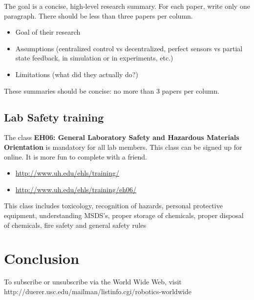 \documentclass[letterpaper, 10 pt, conference]{ieeeconf}
\begin{document}
The goal is a concise, high-level research summary.  For each paper, write only one paragraph.  There should be less than three papers per column.

\begin{itemize}
\item Goal of their research 
\item Assumptions (centralized control vs decentralized, perfect sensors vs partial state feedback, in simulation or in experiments, etc.)
\item Limitations (what did they actually do?)
\end{itemize}

These summaries should be concise: no more than 3 papers per column.


\subsection{Lab Safety training}

The class \textbf{EH06: General Laboratory Safety and Hazardous Materials Orientation} is mandatory for all lab members. This class can be signed up for online. It is more fun to complete with a friend.

\begin{itemize} 
\scriptsize
\item \url{http://www.uh.edu/ehls/training/}
\item \url{http://www.uh.edu/ehls/training/eh06/}
 \end{itemize}

 
 This class includes toxicology, recognition of hazards, personal protective equipment, understanding MSDS's, proper storage of chemicals, proper disposal of chemicals, fire safety and general safety rules


\section{Conclusion}

To subscribe or unsubscribe via the World Wide Web, visit
        http://duerer.usc.edu/mailman/listinfo.cgi/robotics-worldwide

 
 
\end{document}

